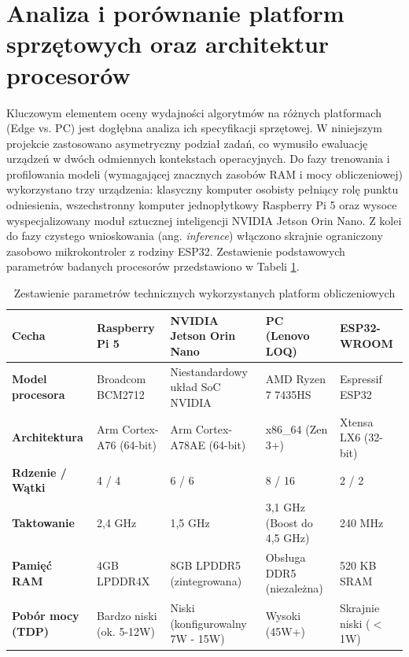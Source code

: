 \documentclass[12pt,twoside]{article}
\begin{document}
\section{Analiza i porównanie platform sprzętowych oraz architektur procesorów}
Kluczowym elementem oceny wydajności algorytmów na różnych platformach (Edge vs. PC) jest dogłębna analiza ich specyfikacji sprzętowej. W niniejszym projekcie zastosowano asymetryczny podział zadań, co wymusiło ewaluację urządzeń w dwóch odmiennych kontekstach operacyjnych. Do fazy trenowania i profilowania modeli (wymagającej znacznych zasobów RAM i mocy obliczeniowej) wykorzystano trzy urządzenia: klasyczny komputer osobisty pełniący rolę punktu odniesienia, wszechstronny komputer jednopłytkowy Raspberry Pi 5 oraz wysoce wyspecjalizowany moduł sztucznej inteligencji NVIDIA Jetson Orin Nano. Z kolei do fazy czystego wnioskowania (ang. \textit{inference}) włączono skrajnie ograniczony zasobowo mikrokontroler z rodziny ESP32. Zestawienie podstawowych parametrów badanych procesorów przedstawiono w Tabeli \ref{tab:cpu}. \cite{rpi5specs}\cite{jetsonspecs}\cite{amdspecs}\cite{esp32}

\begin{table}[htpb]
    \centering
    \caption{Zestawienie parametrów technicznych wykorzystanych platform obliczeniowych}
    \label{tab:cpu}
    \renewcommand{\arraystretch}{1.3} %
    \begin{tabular}{|p{2.5cm}|p{2.8cm}|p{3.5cm}|p{3.0cm}|p{2.5cm}|}
        \hline
        \textbf{Cecha} & \textbf{Raspberry Pi 5} & \textbf{NVIDIA Jetson Orin Nano} & \textbf{PC (Lenovo LOQ)} & \textbf{ESP32-WROOM} \\ 
        \hline
        \textbf{Model procesora} & Broadcom BCM2712 & Niestandardowy układ SoC NVIDIA & AMD Ryzen 7 7435HS & Espressif ESP32 \\ 
        \hline
        \textbf{Architektura} & Arm Cortex-A76 (64-bit) & Arm Cortex-A78AE (64-bit) & x86\_64 (Zen 3+) & Xtensa LX6 (32-bit) \\ 
        \hline
        \textbf{Rdzenie / Wątki} & 4 / 4 & 6 / 6 & 8 / 16 & 2 / 2 \\ 
        \hline
        \textbf{Taktowanie} & 2,4 GHz & 1,5 GHz & 3,1 GHz (Boost do 4,5 GHz) & 240 MHz \\ 
        \hline
        \textbf{Pamięć RAM} & 4GB LPDDR4X & 8GB LPDDR5 (zintegrowana) & Obsługa DDR5 (niezależna) & 520 KB SRAM \\ 
        \hline
        \textbf{Pobór mocy (TDP)} & Bardzo niski (ok. 5-12W) & Niski (konfigurowalny 7W - 15W) & Wysoki (45W+) & Skrajnie niski ($<$ 1W) \\ 
        \hline
    \end{tabular}
\end{table}
\end{document}
